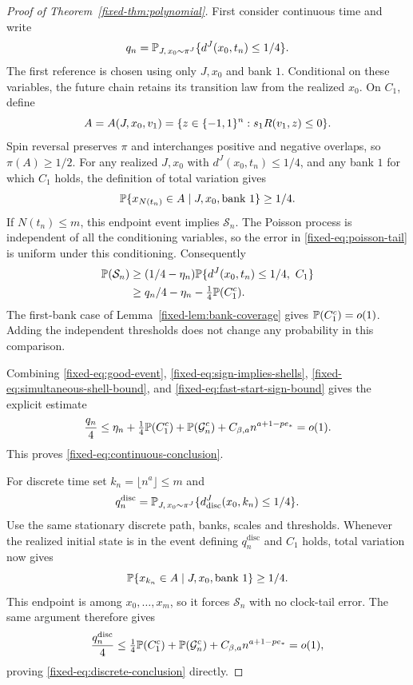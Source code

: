 \begin{proof}[Proof of Theorem~\ref{fixed-thm:polynomial}]
First consider continuous time and write
\[
 q_n=\mathbb P_{J,\,x_0\sim\pi^J}
       \{d^J(x_0,t_n)\le1/4\}.
\]
The first reference is chosen using only $J,x_0$ and bank $1$.
Conditional on these variables, the future chain retains its transition
law from the realized $x_0$. On $C_1$, define
\[
 A=A(J,x_0,v_1)=\{z\in\{-1,1\}^n:s_1R(v_1,z)\le0\}.
\]
Spin reversal preserves $\pi$ and interchanges positive and negative
overlaps, so $\pi(A)\ge1/2$. For any realized $J,x_0$ with
$d^J(x_0,t_n)\le1/4$, and any bank $1$ for which $C_1$ holds, the
definition of total variation gives
\[
 \mathbb P\{x_{N(t_n)}\in A\mid J,x_0,\text{bank }1\}\ge1/4.
\]
If $N(t_n)\le m$, this endpoint event implies $\mathcal S_n$.
The Poisson process is independent of all the conditioning variables,
so the error in \eqref{fixed-eq:poisson-tail} is uniform under this
conditioning. Consequently
\begin{align}
 \mathbb P(\mathcal S_n)
 &\ge(1/4-\eta_n)
      \mathbb P\{d^J(x_0,t_n)\le1/4,\ C_1\}\notag\\
 &\ge q_n/4-\eta_n-\tfrac14\mathbb P(C_1^c).
 \label{fixed-eq:fast-start-sign-bound}
\end{align}
The first-bank case of Lemma~\ref{fixed-lem:bank-coverage} gives
$\mathbb P(C_1^c)=o(1)$. Adding the independent thresholds does not change
any probability in this comparison.

Combining \eqref{fixed-eq:good-event},
\eqref{fixed-eq:sign-implies-shells},
\eqref{fixed-eq:simultaneous-shell-bound}, and
\eqref{fixed-eq:fast-start-sign-bound} gives the explicit estimate
\begin{equation}\label{fixed-eq:fast-start-final-bound}
 \frac{q_n}{4}
 \le\eta_n+\tfrac14\mathbb P(C_1^c)+\mathbb P(\mathcal G_n^c)
       +C_{\beta,a}n^{a+1-pe_*}=o(1).
\end{equation}
This proves \eqref{fixed-eq:continuous-conclusion}.

For discrete time set $k_n=\lfloor n^a\rfloor\le m$ and
\[
 q_n^{\mathrm{disc}}
 =\mathbb P_{J,\,x_0\sim\pi^J}
       \{d_{\mathrm{disc}}^J(x_0,k_n)\le1/4\}.
\]
Use the same stationary discrete path, banks, scales and thresholds.
Whenever the realized initial state is in the event defining
$q_n^{\mathrm{disc}}$ and $C_1$ holds, total variation now gives
\[
 \mathbb P\{x_{k_n}\in A\mid J,x_0,\text{bank }1\}\ge1/4.
\]
This endpoint is among $x_0,\ldots,x_m$, so it forces $\mathcal S_n$
with no clock-tail error. The same argument therefore gives
\begin{equation}\label{fixed-eq:discrete-final-bound}
 \frac{q_n^{\mathrm{disc}}}{4}
 \le\tfrac14\mathbb P(C_1^c)+\mathbb P(\mathcal G_n^c)
       +C_{\beta,a}n^{a+1-pe_*}=o(1),
\end{equation}
proving \eqref{fixed-eq:discrete-conclusion} directly.


\end{proof}
